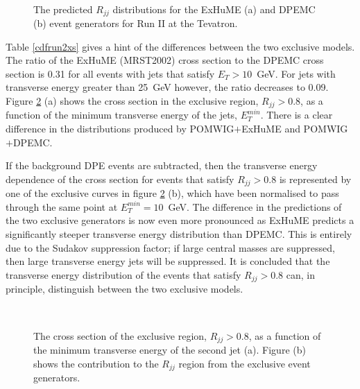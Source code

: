 \begin{figure}[t]
\centering
	\mbox{
	}
\caption[The predicted $R_{jj}$ distributions for the ExHuME and DPEMC event generators for Run II at the Tevatron]{The predicted $R_{jj}$ distributions for the ExHuME (a) and DPEMC (b) event generators for Run II at the Tevatron. \label{cdfrjjrun2}}
\end{figure}

Table \ref{cdfrun2xs} gives a hint of the differences between the two exclusive models. The ratio of the ExHuME (MRST2002) cross section to the DPEMC cross section is 0.31 for all events with jets that satisfy $E_T > 10$~GeV.  For jets with transverse energy greater than 25~GeV however, the ratio decreases to 0.09. Figure \ref{cdfrun2etjet2} (a) shows the cross section in the exclusive region,  $R_{jj}>0.8$, as a function of the minimum transverse energy of the jets, $E_T^{min}$.  There is a clear difference in the distributions produced by POMWIG$+$ExHuME and POMWIG$+$DPEMC. 

 If the background DPE events are subtracted, then the transverse energy dependence of the cross section for events that satisfy $R_{jj} > 0.8$ is represented by one of the exclusive curves in figure \ref{cdfrun2etjet2} (b), which have been normalised to pass through the same point at $E_{T}^{min}=10$~GeV. The difference in the predictions of the two exclusive generators is now even more pronounced as ExHuME predicts a significantly steeper transverse energy distribution than DPEMC. This is entirely due to the Sudakov suppression factor; if large central masses are suppressed, then large transverse energy jets will be suppressed. It is concluded that the transverse energy distribution of the events that satisfy $R_{jj}>0.8$ can, in principle, distinguish between the two exclusive models.

\begin{figure} [t]
\centering
	\mbox{
	}
\caption[The cross section of the exclusive region, $R_{jj} > 0.8$, as a function of the minimum transverse energy of the second jet]{The cross section of the exclusive region, $R_{jj} > 0.8$, as a function of the minimum transverse energy of the second jet (a). Figure (b) shows the contribution to the $R_{jj}$ region from the exclusive event generators. \label{cdfrun2etjet2}}
\end{figure}

